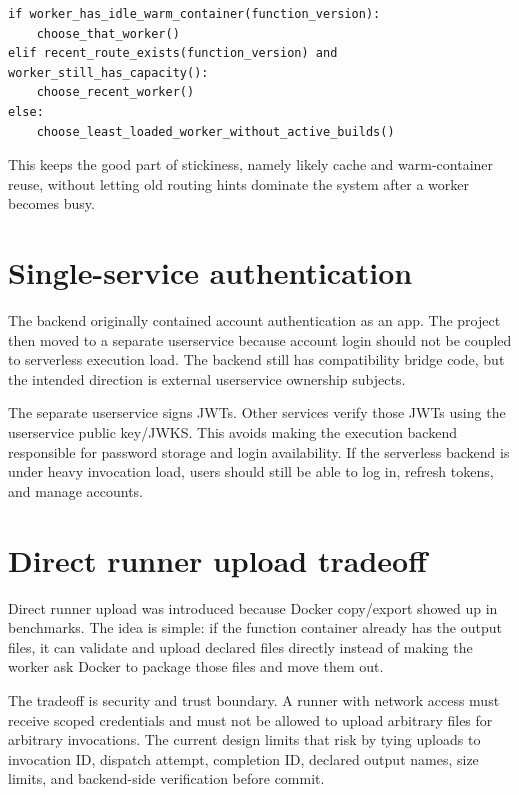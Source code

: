 \documentclass[12pt,a4paper]{report}
\begin{document}
\begin{lstlisting}[caption={Current invocation placement policy, simplified.}]
if worker_has_idle_warm_container(function_version):
    choose_that_worker()
elif recent_route_exists(function_version) and worker_still_has_capacity():
    choose_recent_worker()
else:
    choose_least_loaded_worker_without_active_builds()
\end{lstlisting}

This keeps the good part of stickiness, namely likely cache and warm-container
reuse, without letting old routing hints dominate the system after a worker
becomes busy.

\section{Single-service authentication}

The backend originally contained account authentication as an app. The project
then moved to a separate userservice because account login should not be
coupled to serverless execution load. The backend still has compatibility
bridge code, but the intended direction is external userservice ownership
subjects.

The separate userservice signs JWTs. Other services verify those JWTs using
the userservice public key/JWKS. This avoids making the execution backend
responsible for password storage and login availability. If the serverless
backend is under heavy invocation load, users should still be able to log in,
refresh tokens, and manage accounts.

\section{Direct runner upload tradeoff}

Direct runner upload was introduced because Docker copy/export showed up in
benchmarks. The idea is simple: if the function container already has the
output files, it can validate and upload declared files directly instead of
making the worker ask Docker to package those files and move them out.

The tradeoff is security and trust boundary. A runner with network access must
receive scoped credentials and must not be allowed to upload arbitrary files
for arbitrary invocations. The current design limits that risk by tying uploads
to invocation ID, dispatch attempt, completion ID, declared output names, size
limits, and backend-side verification before commit.
\end{document}
